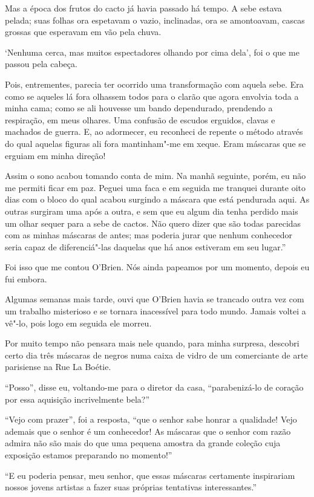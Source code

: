 Mas a época dos frutos do cacto já havia passado há tempo. A sebe estava
pelada; suas folhas ora espetavam o vazio, inclinadas, ora se
amontoavam, cascas grossas que esperavam em vão pela chuva.

`Nenhuma cerca, mas muitos espectadores olhando por cima dela', foi o
que me passou pela cabeça.

Pois, entrementes, parecia ter ocorrido uma transformação com aquela
sebe. Era como se aqueles lá fora olhassem todos para o clarão que agora
envolvia toda a minha cama; como se ali houvesse um bando dependurado,
prendendo a respiração, em meus olhares. Uma confusão de escudos
erguidos, clavas e machados de guerra. E, ao adormecer, eu reconheci de
repente o método através do qual aquelas figuras ali fora mantinham"-me
em xeque. Eram máscaras que se erguiam em minha direção!

Assim o sono acabou tomando conta de mim. Na manhã seguinte, porém, eu
não me permiti ficar em paz. Peguei uma faca e em seguida me tranquei
durante oito dias com o bloco do qual acabou surgindo a máscara que está
pendurada aqui. As outras surgiram uma após a outra, e sem que eu algum
dia tenha perdido mais um olhar sequer para a sebe de cactos. Não quero
dizer que são todas parecidas com as minhas máscaras de antes; mas
poderia jurar que nenhum conhecedor seria capaz de diferenciá"-las
daquelas que há anos estiveram em seu lugar.''

Foi isso que me contou O'Brien. Nós ainda papeamos por um momento,
depois eu fui embora.

Algumas semanas mais tarde, ouvi que O'Brien havia se trancado outra vez
com um trabalho misterioso e se tornara inacessível para todo mundo.
Jamais voltei a vê"-lo, pois logo em seguida ele morreu.

Por muito tempo não pensara mais nele quando, para minha surpresa,
descobri certo dia três máscaras de negros numa caixa de vidro de um
comerciante de arte parisiense na Rue La Boétie.

``Posso'', disse eu, voltando-me para o diretor da casa, ``parabenizá-lo
de coração por essa aquisição incrivelmente bela?''

``Vejo com prazer'', foi a resposta, ``que o senhor sabe honrar a
qualidade! Vejo ademais que o senhor é um conhecedor! As máscaras que o
senhor com razão admira não são mais do que uma pequena amostra da
grande coleção cuja exposição estamos preparando no momento!''

``E eu poderia pensar, meu senhor, que essas máscaras certamente
inspirariam nossos jovens artistas a fazer suas próprias tentativas
interessantes.\label{supra8}''

